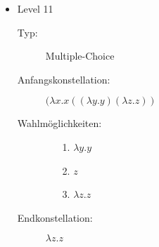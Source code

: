 \begin{itemize}
	\item{Level 11} 
		\begin{description}
			\item[Typ:] Multiple-Choice 
			\item[Anfangskonstellation:] \((\lambda x . x ((\lambda y . y) (\lambda z . z ) ) \)    
			\item[Wahlmöglichkeiten:] \hfill
				\begin{itemize}
					\item[1.] \( \lambda y . y\) 
					\item[2.] \( z \) 
					\item[3.] \(\lambda z . z \)
				\end{itemize}
			\item[Endkonstellation:]\( \lambda z . z\)
		\end{description}


\end{itemize}
